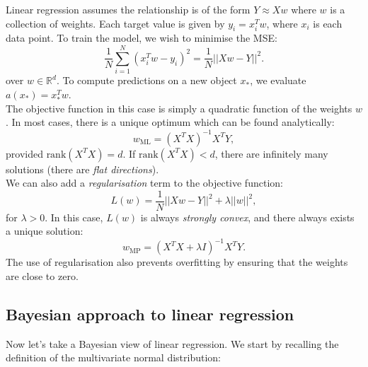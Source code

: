 Linear regression assumes the relationship is of the form $Y \approx Xw$ where $w$ is a collection of weights. Each target value is given by $y_i = x_i^T w$, where $x_i$ is each data point. To train the model, we wish to minimise the MSE:
\begin{equation*}
\frac{1}{N} \sum_{i=1}^{N} (x_i^T w - y_i)^2 = \frac{1}{N} || Xw - Y ||^2.
\end{equation*}
over $w \in \mathbb{R}^d$. To compute predictions on a new object $x_*$, we evaluate $a(x_*) = x_*^T w$.\\

The objective function in this case is simply a quadratic function of the weights $w$. In most cases, there is a unique optimum which can be found analytically:
\begin{equation*}
w_{\text{ML}} = (X^TX)^{-1} X^T Y,
\end{equation*}
provided $\textrm{rank}(X^TX) = d$. If $\textrm{rank}(X^TX) < d$, there are infinitely many solutions (there are \textit{flat directions}).\\

We can also add a \textit{regularisation} term to the objective function:
\begin{equation*}
L(w) = \frac{1}{N} ||X w - Y||^2 + \lambda ||w||^2,
\end{equation*}
for $\lambda > 0$. In this case, $L(w)$ is always \textit{strongly convex}, and there always exists a unique solution:
\begin{equation*}
w_{\text{MP}} = (X^TX + \lambda I)^{-1} X^T Y.
\end{equation*}
The use of regularisation also prevents overfitting by ensuring that the weights are close to zero.


\minirule

\subsection{Bayesian approach to linear regression}
Now let's take a Bayesian view of linear regression. We start by recalling the definition of the multivariate normal distribution:


